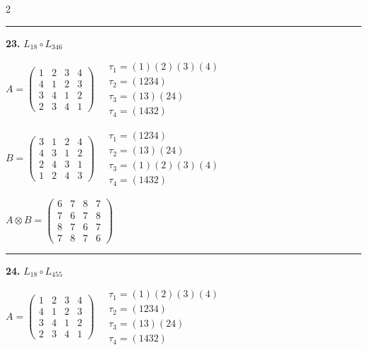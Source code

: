 \begin{multicols}{2}
\vspace{0.3em}
\hrule
\vspace{0.3em}

\noindent\textbf{23.} $L_{18} \circ L_{346}$

$A = \begin{pmatrix} 1 & 2 & 3 & 4 \\ 4 & 1 & 2 & 3 \\ 3 & 4 & 1 & 2 \\ 2 & 3 & 4 & 1 \end{pmatrix} \quad \begin{matrix} \tau_{1}=(1)(2)(3)(4) \\ \tau_{2}=(1 2 3 4) \\ \tau_{3}=(1 3)(2 4) \\ \tau_{4}=(1 4 3 2) \end{matrix}$

$B = \begin{pmatrix} 3 & 1 & 2 & 4 \\ 4 & 3 & 1 & 2 \\ 2 & 4 & 3 & 1 \\ 1 & 2 & 4 & 3 \end{pmatrix} \quad \begin{matrix} \tau_{1}=(1 2 3 4) \\ \tau_{2}=(1 3)(2 4) \\ \tau_{3}=(1)(2)(3)(4) \\ \tau_{4}=(1 4 3 2) \end{matrix}$

$A \otimes B = \begin{pmatrix} 6 & 7 & 8 & 7 \\ 7 & 6 & 7 & 8 \\ 8 & 7 & 6 & 7 \\ 7 & 8 & 7 & 6 \end{pmatrix}$

\vspace{0.3em}
\hrule
\vspace{0.3em}

\noindent\textbf{24.} $L_{18} \circ L_{455}$

$A = \begin{pmatrix} 1 & 2 & 3 & 4 \\ 4 & 1 & 2 & 3 \\ 3 & 4 & 1 & 2 \\ 2 & 3 & 4 & 1 \end{pmatrix} \quad \begin{matrix} \tau_{1}=(1)(2)(3)(4) \\ \tau_{2}=(1 2 3 4) \\ \tau_{3}=(1 3)(2 4) \\ \tau_{4}=(1 4 3 2) \end{matrix}$


\end{multicols}

